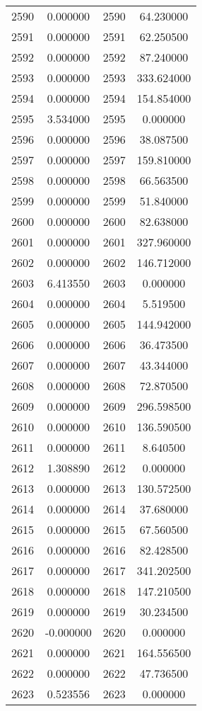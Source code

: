 \documentclass[12pt]{article}
\begin{document}
\begin{longtable}{@{}cccc@{}}
2590 & 0.000000 & 2590 & 64.230000 \\
2591 & 0.000000 & 2591 & 62.250500 \\
2592 & 0.000000 & 2592 & 87.240000 \\
2593 & 0.000000 & 2593 & 333.624000 \\
2594 & 0.000000 & 2594 & 154.854000 \\
2595 & 3.534000 & 2595 & 0.000000 \\
2596 & 0.000000 & 2596 & 38.087500 \\
2597 & 0.000000 & 2597 & 159.810000 \\
2598 & 0.000000 & 2598 & 66.563500 \\
2599 & 0.000000 & 2599 & 51.840000 \\
2600 & 0.000000 & 2600 & 82.638000 \\
2601 & 0.000000 & 2601 & 327.960000 \\
2602 & 0.000000 & 2602 & 146.712000 \\
2603 & 6.413550 & 2603 & 0.000000 \\
2604 & 0.000000 & 2604 & 5.519500 \\
2605 & 0.000000 & 2605 & 144.942000 \\
2606 & 0.000000 & 2606 & 36.473500 \\
2607 & 0.000000 & 2607 & 43.344000 \\
2608 & 0.000000 & 2608 & 72.870500 \\
2609 & 0.000000 & 2609 & 296.598500 \\
2610 & 0.000000 & 2610 & 136.590500 \\
2611 & 0.000000 & 2611 & 8.640500 \\
2612 & 1.308890 & 2612 & 0.000000 \\
2613 & 0.000000 & 2613 & 130.572500 \\
2614 & 0.000000 & 2614 & 37.680000 \\
2615 & 0.000000 & 2615 & 67.560500 \\
2616 & 0.000000 & 2616 & 82.428500 \\
2617 & 0.000000 & 2617 & 341.202500 \\
2618 & 0.000000 & 2618 & 147.210500 \\
2619 & 0.000000 & 2619 & 30.234500 \\
2620 & -0.000000 & 2620 & 0.000000 \\
2621 & 0.000000 & 2621 & 164.556500 \\
2622 & 0.000000 & 2622 & 47.736500 \\
2623 & 0.523556 & 2623 & 0.000000 \\

\end{longtable}
\end{document}

